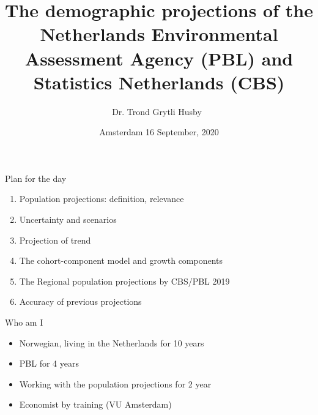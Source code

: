 \documentclass[final, 12pt, aspectratio=169, xcolor={dvipsnames}]{beamer}
\title[PEARL]{The demographic projections of the Netherlands Environmental Assessment Agency (PBL) and Statistics Netherlands (CBS)}
\subtitle[PEARL]{}
\author[T. Husby]{Dr. Trond Grytli Husby\ }
\institute[PBL]{
  Netherlands Environmental Assessment Agency (PBL) \\[5ex]
  \texttt{trond.husby@pbl.nl}
}
\date[\today]{Amsterdam 16 September, 2020}
\begin{document}
\beamertemplatenavigationsymbolsempty

{

  \begin{frame}
    \titlepage
  \end{frame}
}



\begin{frame}{Plan for the day}  
  \begin{enumerate}
  \item Population projections: definition, relevance
  \item Uncertainty and scenarios
  \item Projection of trend
  \item The cohort-component model and growth components
  \item The Regional population projections by CBS/PBL 2019 \href{https://themasites.pbl.nl/regionale-bevolkingsprognose/}{}
  \item Accuracy of previous projections
    \end{enumerate}
\end{frame}


\begin{frame}{Who am I}
  \begin{itemize}
  \item Norwegian, living in the Netherlands for 10 years 
  \item PBL for 4 years
  \item Working with the population projections for 2 year
    \item Economist by training (VU Amsterdam)
    \end{itemize}
\end{frame}

\end{document}
